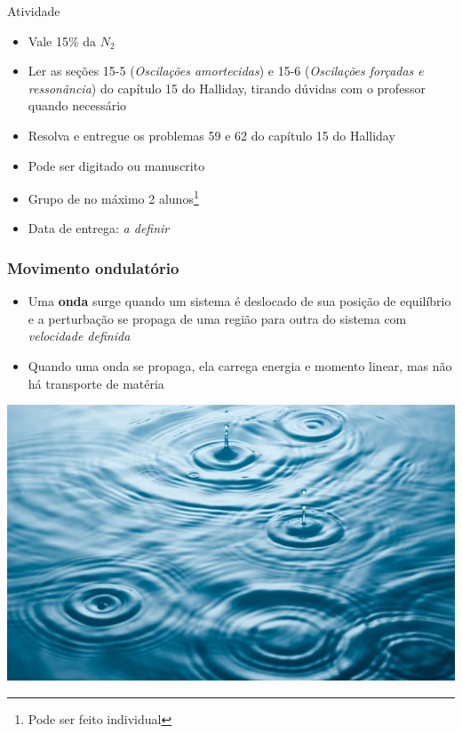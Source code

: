 \documentclass[t,%
brazilian,%
11pt,%
aspectratio=169,%
table%
]{beamer}
\begin{document}
\begin{frame}{Atividade}
    \begin{itemize}
        \item Vale 15\% da \(N_2\)
        \item Ler as seções 15-5 (\textit{Oscilações amortecidas}) e 15-6 
            (\textit{Oscilações forçadas e ressonância}) do capítulo 15 do Halliday, tirando
            dúvidas com o professor quando necessário
        \item Resolva e entregue os problemas 59 e 62 do capítulo 15 do Halliday
        \item Pode ser digitado ou manuscrito
        \item Grupo de no máximo 2 alunos\footnote{Pode ser feito individual}
        \item Data de entrega: \textit{a definir}
    \end{itemize}
\end{frame}

\begin{frame}
    \frametitle{Movimento ondulatório}
    \begin{itemize}
        \item Uma \textbf{onda} surge quando um sistema é deslocado de sua posição de
            equilíbrio e a perturbação se propaga de uma região para outra do
            sistema com \textit{velocidade definida} 
        \item Quando uma onda se propaga, ela carrega energia e momento linear, mas
            não há transporte de matéria
    \end{itemize}
    \centering
    \includegraphics[height=\textheight-90pt]{images/ondas.png}
\end{frame}
\end{document}
